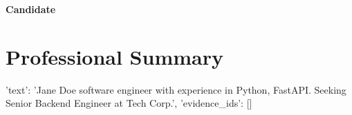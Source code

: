 \documentclass[10pt, letterpaper]{article}
\begin{document}
\begin{center}
    {\huge \bfseries \color{primary} Candidate} \\[4pt]
    \small \color{darkgray}
    
    
    
    
    
\end{center}


\section{Professional Summary}
{'text': 'Jane Doe software engineer with experience in Python, FastAPI. Seeking Senior Backend Engineer at Tech Corp.', 'evidence_ids': []}
\end{document}
